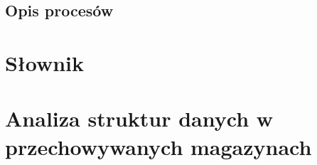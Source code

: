 \documentclass[paper=a4, fontsize=12pt]{scrartcl}
\numberwithin{equation}{section}		%
\numberwithin{figure}{section}			%
\numberwithin{table}{section}				%
\begin{document}
	\subsection{Opis procesów}
		

\section{Słownik}
	

\section{Analiza struktur danych w przechowywanych magazynach}
	







\end{document}
